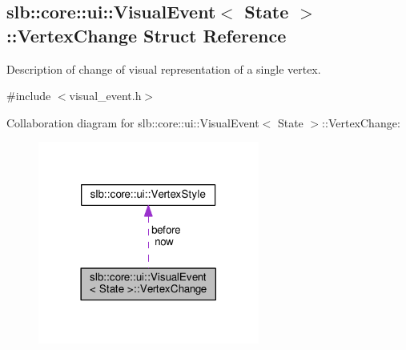 \hypertarget{structslb_1_1core_1_1ui_1_1VisualEvent_1_1VertexChange}{}\subsection{slb\+:\+:core\+:\+:ui\+:\+:Visual\+Event$<$ State $>$\+:\+:Vertex\+Change Struct Reference}
\label{structslb_1_1core_1_1ui_1_1VisualEvent_1_1VertexChange}


Description of change of visual representation of a single vertex.  




{\ttfamily \#include $<$visual\+\_\+event.\+h$>$}



Collaboration diagram for slb\+:\+:core\+:\+:ui\+:\+:Visual\+Event$<$ State $>$\+:\+:Vertex\+Change\+:\nopagebreak
\begin{figure}[H]
\begin{center}
\leavevmode
\includegraphics[width=206pt]{structslb_1_1core_1_1ui_1_1VisualEvent_1_1VertexChange__coll__graph}
\end{center}
\end{figure}
